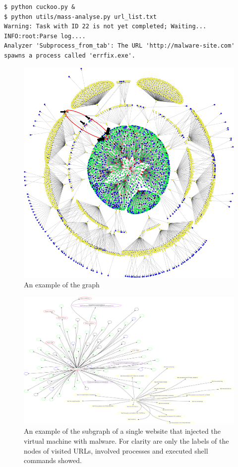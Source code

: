 \begin{lstlisting}
$ python cuckoo.py &
$ python utils/mass-analyse.py url_list.txt
Warning: Task with ID 22 is not yet completed; Waiting...
INFO:root:Parse log....
Analyzer 'Subprocess_from_tab': The URL 'http://malware-site.com' 
spawns a process called 'errfix.exe'.
\end{lstlisting}

\begin{figure}[h]
    \centering
    \centerline{\includegraphics[width=20cm]{Images/graph3.png}}
    \caption{An example of the graph}
    \label{fig:graph}
\end{figure}

\begin{figure}[h]
    \centering
    \includegraphics[width=25cm, angle=90]{Images/report_Subprocess_from_tab}
    \caption{An example of the subgraph of a single website that injected the virtual machine with malware. For clarity are only the labels of the nodes of visited URLs, involved processes and executed shell commands showed.}
    \label{fig:subgraph}
\end{figure}

